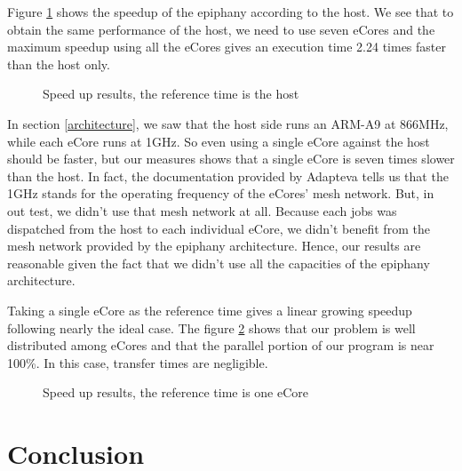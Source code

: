 Figure \ref{fig speedup} shows the speedup of the \gls{epiphany} according to the host. We see that to obtain the same performance of the host, we need to use seven \glspl{eCore} and the maximum speedup using all the \glspl{eCore} gives an execution time 2.24 times faster than the host only.

\begin{figure}[h!]
\centering
\noindent{}
\caption{Speed up results, the reference time is the host}
\label{fig speedup}
\end{figure}

In section \ref{architecture}, we saw that the host side runs an ARM-A9 at 866MHz, while each \gls{eCore} runs at 1GHz. So even using a single \gls{eCore} against the host should be faster, but our measures shows that a single \gls{eCore} is seven times slower than the host. In fact, the documentation provided by Adapteva\cite{epiphanyArch}\cite{parallellamanual} tells us that the 1GHz stands for the operating frequency of the \glspl{eCore}' mesh network. But, in out test, we didn't use that mesh network at all. Because each jobs was dispatched from the host to each individual \gls{eCore}, we didn't benefit from the mesh network provided by the \gls{epiphany} architecture. Hence, our results are reasonable given the fact that we didn't use all the capacities of the \gls{epiphany} architecture.

Taking a single \gls{eCore} as the reference time gives a linear growing speedup following nearly the ideal case. The figure \ref{fig speedup2} shows that our problem is well distributed among \glspl{eCore} and that the parallel portion of our program is near 100\%. In this case, transfer times are negligible. 

\begin{figure}[h!]
\centering
\noindent{}
\caption{Speed up results, the reference time is one \gls{eCore}}
\label{fig speedup2}
\end{figure}


\section{Conclusion}

